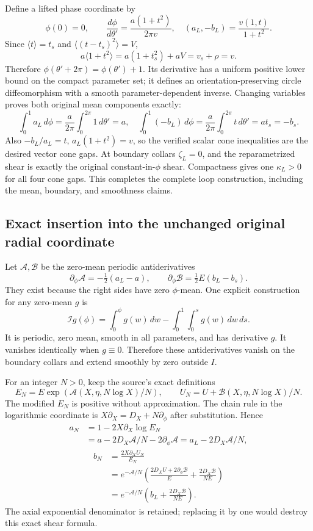 \documentclass[10pt,a4paper]{article}
\begin{document}
Define a lifted phase coordinate by \[
\phi(0)=0,\qquad
\frac{d\phi}{d\theta'}=\frac{a(1+t^2)}{2\pi v},
\quad
(a_L,-b_L)=\frac{v(1,t)}{1+t^2}.
\] Since \(\langle t\rangle=t_s\) and \(\langle(t-t_s)^2\rangle=V\), \[
a\langle1+t^2\rangle=a(1+t_s^2)+aV=v_s+\rho=v.
\] Therefore \(\phi(\theta'+2\pi)=\phi(\theta')+1\). Its derivative has a uniform positive lower bound on the compact parameter set; it defines an orientation-preserving circle diffeomorphism with a smooth parameter-dependent inverse. Changing variables proves both original mean components exactly: \[
\int_0^1a_L\,d\phi
=\frac a{2\pi}\int_0^{2\pi}1\,d\theta'=a,
\quad
\int_0^1(-b_L)\,d\phi
=\frac a{2\pi}\int_0^{2\pi}t\,d\theta'=at_s=-b_s.
\] Also \(-b_L/a_L=t\), \(a_L(1+t^2)=v\), so the verified scalar cone inequalities are the desired vector cone gaps. At boundary collars \(\zeta_L=0\), and the reparametrized shear is exactly the original constant-in-\(\phi\) shear. Compactness gives one \(\kappa_L>0\) for all four cone gaps. This completes the complete loop construction, including the mean, boundary, and smoothness claims.

\subsection{Exact insertion into the unchanged original radial coordinate}\label{exact-insertion-into-the-unchanged-original-radial-coordinate}

Let \(\mathcal A,\mathcal B\) be the zero-mean periodic antiderivatives \[
\partial_\phi\mathcal A=-\tfrac12(a_L-a),\qquad
\partial_\phi\mathcal B=\tfrac12E(b_L-b_s).
\] They exist because the right sides have zero \(\phi\)-mean. One explicit construction for any zero-mean \(g\) is \[
\mathcal I g(\phi)=\int_0^\phi g(w)\,dw-
\int_0^1\int_0^s g(w)\,dw\,ds.
\] It is periodic, zero mean, smooth in all parameters, and has derivative \(g\). It vanishes identically when \(g\equiv0\). Therefore these antiderivatives vanish on the boundary collars and extend smoothly by zero outside \(I\).

For an integer \(N>0\), keep the source's exact definitions \[
E_N=E\exp(\mathcal A(X,\eta,N\log X)/N),\qquad
U_N=U+\mathcal B(X,\eta,N\log X)/N.
\] The modified \(E_N\) is positive without approximation. The chain rule in the logarithmic coordinate is \(X\partial_X=D_X+N\partial_\phi\) after substitution. Hence \[
\begin{aligned}
a_N
&=1-2X\partial_X\log E_N\\
&=a-2D_X\mathcal A/N-2\partial_\phi\mathcal A
=a_L-2D_X\mathcal A/N,
\end{aligned}
\] \[
\begin{aligned}
b_N
&=\frac{2X\partial_XU_N}{E_N}\\
&=e^{-\mathcal A/N}
\left(\frac{2D_XU+2\partial_\phi\mathcal B}{E}
+\frac{2D_X\mathcal B}{NE}\right)\\
&=e^{-\mathcal A/N}
\left(b_L+\frac{2D_X\mathcal B}{NE}\right).
\end{aligned}
\] The axial exponential denominator is retained; replacing it by one would destroy this exact shear formula.
\end{document}
